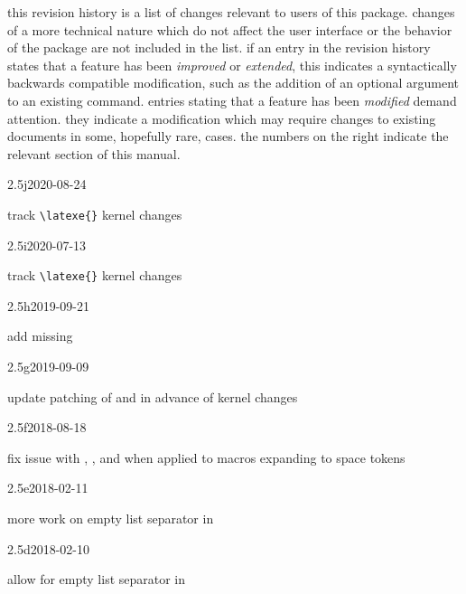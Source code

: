 this revision history is a list of changes relevant to users of this package. changes of a more technical nature which do not affect the user interface or the behavior of the package are not included in the list. if an entry in the revision history states that a feature has been \emph{improved} or \emph{extended}, this indicates a syntactically backwards compatible modification, such as the addition of an optional argument to an existing command. entries stating that a feature has been \emph{modified} demand attention. they indicate a modification which may require changes to existing documents in some, hopefully rare, cases. the numbers on the right indicate the relevant section of this manual.

\begin{changelog}

\begin{release}{2.5j}{2020-08-24}
\item track \verb|\latexe{}| kernel changes
\end{release}

\begin{release}{2.5i}{2020-07-13}
\item track \verb|\latexe{}| kernel changes
\end{release}

\begin{release}{2.5h}{2019-09-21}
\item add missing 
\end{release}

\begin{release}{2.5g}{2019-09-09}
\item update patching of  and  in advance of \latex{}
  kernel changes
\end{release}

\begin{release}{2.5f}{2018-08-18}
\item fix issue with , , 
  and  when applied to macros expanding to space tokens
\end{release}

\begin{release}{2.5e}{2018-02-11}
\item more work on empty list separator in 
\end{release}

\begin{release}{2.5d}{2018-02-10}
\item allow for empty list separator in 
\end{release}


\end{changelog}
